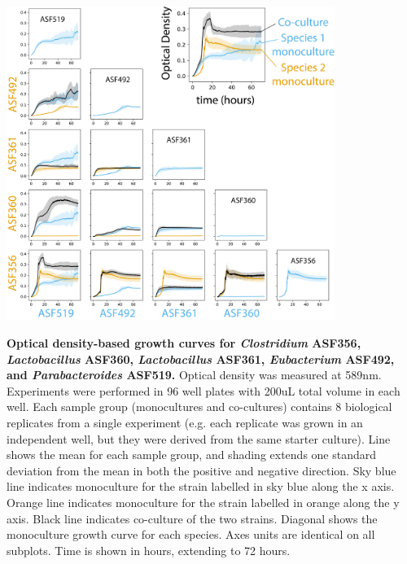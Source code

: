 \documentclass[11pt,twocolumn,notitlepage,openany,twoside]{book}
\begin{document}
\begin{refsection}
\begin{suppfigure*}
\centering
\includegraphics[width=0.8\textwidth]{ch2_figS2}
\caption[Optical density-based growth curves for \textit{Clostridium} ASF356, \textit{Lactobacillus} ASF360, \textit{Lactobacillus} ASF361, \textit{Eubacterium} ASF492, and \textit{Parabacteroides} ASF519.]{\textbf{Optical density-based growth curves for \textit{Clostridium} ASF356, \textit{Lactobacillus} ASF360, \textit{Lactobacillus} ASF361, \textit{Eubacterium} ASF492, and \textit{Parabacteroides} ASF519.} Optical density was measured at 589nm. Experiments were performed in 96 well plates with 200uL total volume in each well. Each sample group (monocultures and co-cultures) contains 8 biological replicates from a single experiment (e.g. each replicate was grown in an independent well, but they were derived from the same starter culture). Line shows the mean for each sample group, and shading extends one standard deviation from the mean in both the positive and negative direction. Sky blue line indicates monoculture for the strain labelled in sky blue along the x axis. Orange line indicates monoculture for the strain labelled in orange along the y axis. Black line indicates co-culture of the two strains. Diagonal shows the monoculture growth curve for each species. Axes units are identical on all subplots. Time is shown in hours, extending to 72 hours.}
\end{suppfigure*}

\end{refsection}

\end{document}
